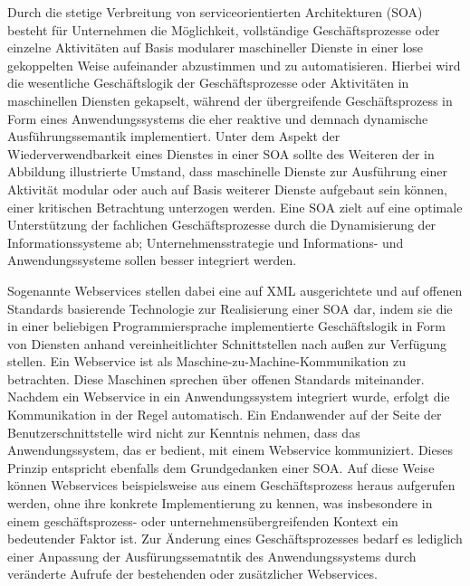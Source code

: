 Durch die stetige Verbreitung von serviceorientierten Architekturen (\acs{SOA}) besteht für Unternehmen die Möglichkeit, vollständige Geschäftsprozesse oder einzelne Aktivitäten auf Basis modularer maschineller Dienste in einer lose gekoppelten Weise aufeinander abzustimmen und zu automatisieren. 
Hierbei wird die wesentliche Geschäftslogik der Geschäftsprozesse oder Aktivitäten in maschinellen Diensten gekapselt, während der übergreifende Geschäftsprozess in Form eines Anwendungssystems die eher reaktive und demnach dynamische Ausführungssemantik implementiert. 
Unter dem Aspekt der Wiederverwendbarkeit eines Dienstes in einer \ac{SOA} sollte des Weiteren der in Abbildung  illustrierte Umstand, dass maschinelle Dienste zur Ausführung einer Aktivität modular oder auch auf Basis weiterer Dienste aufgebaut sein können, einer kritischen Betrachtung unterzogen werden.
Eine \ac{SOA} zielt auf eine optimale Unterstützung der fachlichen Geschäftsprozesse durch die Dynamisierung der Informationssysteme ab; Unternehmensstrategie und Informations- und Anwendungssysteme sollen besser integriert werden.


Sogenannte Webservices stellen dabei eine auf \ac{XML} ausgerichtete und auf offenen Standards basierende Technologie zur Realisierung einer \ac{SOA} dar, indem sie die in einer beliebigen Programmiersprache implementierte Geschäftslogik in Form von Diensten anhand vereinheitlichter Schnittstellen nach außen zur Verfügung stellen.
\cite{Finger.2009b}
Ein Webservice ist als Maschine-zu-Machine-Kommunikation zu betrachten. Diese Maschinen sprechen über offenen Standards miteinander. 
Nachdem ein Webservice in ein Anwendungssystem integriert wurde, erfolgt die Kommunikation in der Regel automatisch. 
Ein Endanwender auf der Seite der Benutzerschnittstelle wird nicht zur Kenntnis nehmen, dass das Anwendungssystem, das er bedient, mit einem Webservice kommuniziert. Dieses Prinzip entspricht ebenfalls dem Grundgedanken einer \ac{SOA}.
Auf diese Weise können Webservices beispielsweise aus einem Geschäftsprozess heraus aufgerufen werden, ohne ihre konkrete Implementierung zu kennen, was insbesondere in einem geschäftsprozess- oder unternehmensübergreifenden Kontext ein bedeutender Faktor ist. Zur Änderung eines Geschäftsprozesses bedarf es lediglich einer Anpassung der Ausfürungssematntik des Anwendungssystems durch veränderte Aufrufe der bestehenden oder zusätzlicher Webservices. 

